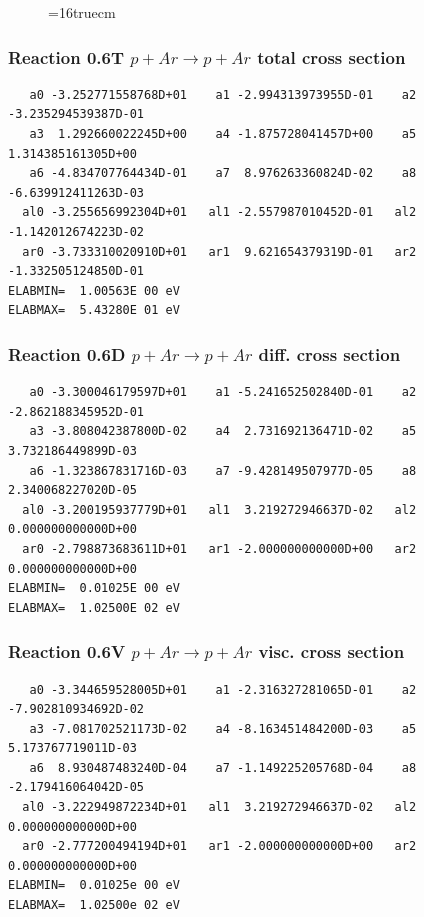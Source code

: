 \documentclass[12pt,dvips]{article}
\begin{document}
\begin{figure} \label{0.5}
\epsfxsize=16truecm
\end{figure}
\newpage



\subsubsection{
Reaction 0.6T   $ p + Ar \rightarrow p + Ar $ total cross
section }



\begin{small}\begin{verbatim}
   a0 -3.252771558768D+01    a1 -2.994313973955D-01    a2 -3.235294539387D-01
   a3  1.292660022245D+00    a4 -1.875728041457D+00    a5  1.314385161305D+00
   a6 -4.834707764434D-01    a7  8.976263360824D-02    a8 -6.639912411263D-03
  al0 -3.255656992304D+01   al1 -2.557987010452D-01   al2 -1.142012674223D-02
  ar0 -3.733310020910D+01   ar1  9.621654379319D-01   ar2 -1.332505124850D-01
ELABMIN=  1.00563E 00 eV
ELABMAX=  5.43280E 01 eV
\end{verbatim}\end{small}

\subsubsection{
Reaction 0.6D    $p + Ar \rightarrow p + Ar  $ diff. cross
section }


\begin{small}\begin{verbatim}
   a0 -3.300046179597D+01    a1 -5.241652502840D-01    a2 -2.862188345952D-01
   a3 -3.808042387800D-02    a4  2.731692136471D-02    a5  3.732186449899D-03
   a6 -1.323867831716D-03    a7 -9.428149507977D-05    a8  2.340068227020D-05
  al0 -3.200195937779D+01   al1  3.219272946637D-02   al2  0.000000000000D+00
  ar0 -2.798873683611D+01   ar1 -2.000000000000D+00   ar2  0.000000000000D+00
ELABMIN=  0.01025E 00 eV
ELABMAX=  1.02500E 02 eV
\end{verbatim}\end{small}

\subsubsection{
Reaction 0.6V   $ p + Ar \rightarrow p + Ar  $ visc. cross
section }


\begin{small}\begin{verbatim}
   a0 -3.344659528005D+01    a1 -2.316327281065D-01    a2 -7.902810934692D-02
   a3 -7.081702521173D-02    a4 -8.163451484200D-03    a5  5.173767719011D-03
   a6  8.930487483240D-04    a7 -1.149225205768D-04    a8 -2.179416064042D-05
  al0 -3.222949872234D+01   al1  3.219272946637D-02   al2  0.000000000000D+00
  ar0 -2.777200494194D+01   ar1 -2.000000000000D+00   ar2  0.000000000000D+00
ELABMIN=  0.01025e 00 eV
ELABMAX=  1.02500e 02 eV
\end{verbatim}\end{small}
\end{document}
